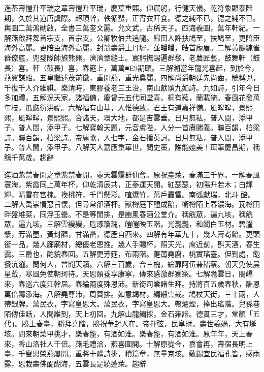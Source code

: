 \begin{pinyinscope}
進茶壽愷升平瑞之章壽愷升平瑞，慶葉重熙。仰宸躬，行健天儀。乾符象顯泰階期，久於其道唐虞際。超頊幹，軼循蜚，正宵衣旰食。德之純不已，德之純不已。輿圖二萬鴻勛啟，全書三萬奎文麗。允文武，古稀天子。四海羲圖，萬年軒紀。一解燕啟拜舞首宗支，首宗支，公卿牧伯共追隨。歸田人許扶鳩至，扶鳩至，更陪臣海外高麗。更陪臣海外高麗，封翁壽爵上丹墀，並皤皤，皓首龐眉。二解黃鸝練雀群僚底，兜鍪隊帥旅熊羆，濟濟章縫士。宸躬撫錫遍群黎，老農匠藝，鼓舞軒（鼓長）喜。軒（鼓長）喜，春筵上，萬萬■E9期頤。三解溯當年龍光喜起，到於今，燕翼謀貽。五皇繼述茂前徽，重開燕，重光奠麗。四解尚爵朝廷先尚齒，觥稱兕，千復千人介維祺。樂清時，東膠養老三王治，南山獻頌九如詩。九如詩，引年今日多加禮。五解況天家，諸福備，慶曾元五代同堂喜。桐有蕤，蘭載猗。春風花發萬年枝，瓜瓞衍洪禔。六解福有由基，人惟德致，君王有道嘉祥備。風皞皞，景熙熙，風皞皞，景熙熙。合諸天，環大地，都是吉雲垂。日月無私，普人間，添甲子。普人間，添甲子。七解寶翰天題，元音虞陛，人分一首賡颺義。聯百韻，柏梁詩。聯百韻，柏梁詩。帝庸歌，人七字，金石播英詞。日月無私，普人間，添甲子。普人間，添甲子。八解天人嘉應重華世，問史策，誰能媲美！珥筆慶昌期，稱觴千萬歲。趨辭

進酒紫禁春開之章紫禁春開，壺天雲靄群仙會。原祝臺萊，春滿三千界。一解春風寰海，紫霞同上萬年杯，仰乾清辰共，正泰運天開。紅瑟瑟，初陽升若木；白輝輝，晴雪在宮槐。換桃符，千門懸彩。喧爆竹，萬戶轟雷。南弧獻瑞，北斗醅。二解大禹崇情惡旨懷，但尋常卻酒杯。獸樽庭下醴成醅，衢樽陌上春濃海。瓦樽田畔盤堆菜，同浮玉罍。不是等閒排，是豳風春酒公堂介。稱觥眾，遍九垓，稱觥眾，遍九垓。三解雲縵縵，卮琢瓊瑰，皚皚映玉階。光灩灩，和闐白玉材。碧瀣漿，芳滿壺，黃封醖，甘滿罍，德產自西來。四解有年華九十，幾人壽耇鮐。更頭銜一品，幾人廊廟材，總優老恩推。幾人手賜杯，照天光，席近前，斟天酒，春生靄。三爵也，酡貌春回。五解更芳筵，布兩階。萐莆堯廚，桃實瑤臺。但到處，飽餐沆瀣。問何人，曾聞天籟。六解三百歲，合三槐，綸扉阿伍兼嵇蔡。朝天免使晨星戴，寒風免使朝珂待。天恩頤養享康寧，傳來感激群寮寀。七解瞻雲日，閱嶠來，春巡六度江幹屆。春綸兩度殊恩沛。新銜司業諸生拜。持將百五歲春秋，酬恩萬倍籌添海。八解堯尊沛，周賚排。如意朅材，繡緞雲裁。鳩杖天街，三十兩，人帶銀牌。萬民衣，字寫皇恩大。萬民衣，字寫皇恩大。帶爐煙，捧出瑤階。兒孫巷陌傳佳話，人間誰到，天上初回。九解山龍繡採，金石雍諧。德貫三才，堂顏「五代」。勝上春臺，勝拜堯階，勝祝華封人在。帝揮弦，民阜財。壽世羲媧，大有埏垓。問來朝菜甲挑才，樂春盤，有酒如淮。樂春盤，有酒如淮。原年年，天上春來，香山洛社人千倍。燕毛禮洽，燕喜圖開。十解原從今，嘉會再，壽宿長明上臺，千叟恩榮燕屢開。重將十體詩排，積篇章，無量京垓。敷錫宜民福孔皆，感雨露，恩栽壽佛醍醐海，五雲長是繞蓬萊。趨辭


\end{pinyinscope}
